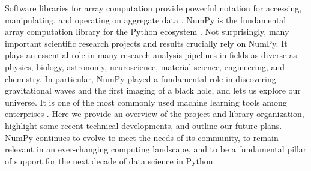 




Software libraries for array computation provide powerful notation
for accessing, manipulating, and operating on aggregate data \cite{iverson1980notation}.
NumPy is the fundamental array computation library for the Python ecosystem
\cite{dubois2007guest,oliphant2007python,millman2011python,perez2011python}.
Not surprisingly, many important scientific research projects and results
crucially rely on NumPy.
It plays an essential role in many research analysis pipelines in fields as
diverse as physics, biology, astronomy, neuroscience, material science,
engineering, and chemistry.
In particular, NumPy played a fundamental role in discovering gravitational
waves\cite{pycbc} and the first imaging of a black hole\cite{eht-imaging}, and
lets us explore our universe\cite{jenness2018lsst}.
It is one of the most commonly used machine learning tools among enterprises
\cite{451report2018}.
Here we provide an overview of the project and library organization,  highlight
some recent technical developments, and outline our future plans.
NumPy continues to evolve to meet the needs of its community, to remain
relevant in an ever-changing computing landscape, and to be a fundamental
pillar of support for the next decade of data science in Python.
